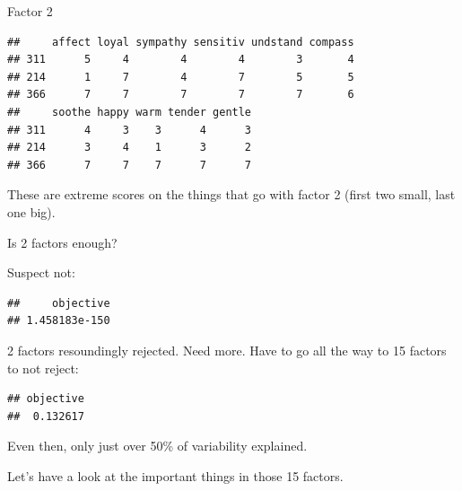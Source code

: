 \begin{frame}[fragile]{Factor 2}
 
  {\small
\begin{knitrout}
\color{fgcolor}\begin{kframe}
\begin{alltt}
\hlstd{bem[}\hlstd{(}\hlstd{,}\hlstd{,}\hlstd{),big2]}
\end{alltt}
\begin{verbatim}
##     affect loyal sympathy sensitiv undstand compass
## 311      5     4        4        4        3       4
## 214      1     7        4        7        5       5
## 366      7     7        7        7        7       6
##     soothe happy warm tender gentle
## 311      4     3    3      4      3
## 214      3     4    1      3      2
## 366      7     7    7      7      7
\end{verbatim}
\end{kframe}
\end{knitrout}
}

These are extreme scores on the things that go with factor 2 (first
two small, last one big).
  
\end{frame}
  

\begin{frame}[fragile]{Is 2 factors enough?}
  
  Suspect not:
  
\begin{knitrout}
\color{fgcolor}\begin{kframe}
\begin{alltt}
\hlopt{$}
\end{alltt}
\begin{verbatim}
##     objective 
## 1.458183e-150
\end{verbatim}
\end{kframe}
\end{knitrout}

2 factors resoundingly rejected. Need more. Have to go all the way to
15 factors to not reject:

\begin{knitrout}
\color{fgcolor}\begin{kframe}
\begin{alltt}
\hlkwb{=}\hlstd{(bem[,}\hlopt{-}\hlstd{],}\hlstd{=}\hlstd{)}
\hlopt{$}
\end{alltt}
\begin{verbatim}
## objective 
##  0.132617
\end{verbatim}
\end{kframe}
\end{knitrout}

Even then, only just over 50\% of variability explained.

Let's have a look at the important things in those 15 factors.

\end{frame}

